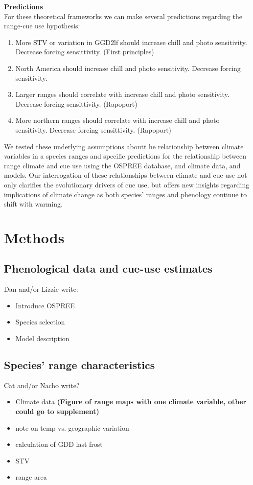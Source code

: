 \documentclass[11pt]{article}\usepackage[]{graphicx}\usepackage[]{color}
\begin{document}
\textbf{Predictions}\\
For these theoretical frameworks we can make several predictions regarding the range-cue use hypothesis:\\
\begin{enumerate}
\item More STV or variation in GGD2lf should increase chill and photo sensitivity. Decrease forcing sensittivity. (First principles)
\item North America should increase chill and photo sensitivity. Decrease forcing sensitivity.
\item Larger ranges should correlate with increase chill and photo sensitivity. Decrease forcing sensittivity. (Rapoport)
\item More northern ranges should correlate with increase chill and photo sensitivity. Decrease forcing sensittivity. (Rapoport)
\end{enumerate}

We tested these underlying assumptions aboutt he relationship between climate variables in a species ranges and specific predictions for the relationship between range climate and cue use using the OSPREE database, and climate data, and models. Our interrogation of these relationships between climate and cue use not only clarifies the evolutionary drivers of cue use, but offers new insights regarding implications of climate change as both species' ranges and phenology continue to shift with warming.

\section*{Methods}
\subsection*{Phenological data and cue-use estimates}
Dan and/or Lizzie write:
\begin{itemize}
\item Introduce OSPREE
\item Species selection
\item Model description
\end{itemize}

\subsection*{Species' range characteristics}
Cat and/or Nacho write?\\
\begin{itemize}
\item Climate data \textbf{(Figure of range maps with one climate variable, other could go to supplement)}
\item note on temp vs. geographic variation
\item calculation of GDD last frost
\item STV
\item range area
\end{itemize}
\end{document}
